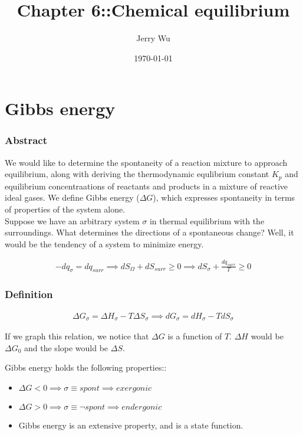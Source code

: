 \documentclass[12pt]{book}
\title{Chapter 6::Chemical equilibrium}
\author{Jerry Wu}
\date{\today}
\begin{document}
\maketitle

\chapter*{Gibbs energy}
\subsection*{Abstract}
We would like to determine the spontaneity of a reaction mixture to approach equilibrium, along with deriving the thermodynamic equlibrium constant $K_p$ and equilibrium concentraations of reactants and products in a mixture of reactive ideal gases. We define Gibbs energy ($\Delta G$), which expresses spontaneity in terms of properties of the system alone.\\

Suppose we have an arbitrary system $\sigma$ in thermal equilibrium with the surroundings. What determines the directions of a spontaneous change? Well, it would be the tendency of a system to minimize energy.

\begin{align*}
    -dq_{\sigma}=dq_{surr}\implies dS_{\Omega}+dS_{surr}\geq 0\implies dS_{\sigma}+\frac{dq_{surr}}{T}\geq 0
\end{align*}

\subsection*{Definition}
\begin{align*}
    \Delta G_{\sigma}=\Delta H_{\sigma}-T\Delta S_{\sigma}\implies dG_{\sigma}=dH_{\sigma}-TdS_{\sigma}
\end{align*}

If we graph this relation, we notice that $\Delta G$ is a function of $T$. $\Delta H$ would be $\Delta G_0$ and the slope would be $\Delta S$.

Gibbs energy holds the following properties::

\begin{itemize}
    \item $\Delta G<0\implies \sigma\equiv spont\implies exergonic$
    \item $\Delta G>0\implies \sigma\equiv \lnot spont\implies endergonic$
    \item Gibbs energy is an extensive property, and is a state function.
\end{itemize}
\end{document}
